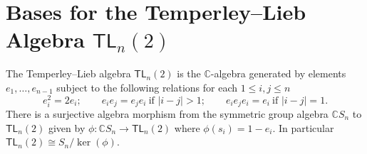 \documentclass[submission]{FPSAC2024}
\theoremstyle{definition}
\theoremstyle{remark}
\numberwithin{equation}{section}
\newcommand{\CC}{\mathbb{C}}
\newcommand{\TL}{\mathsf{TL}}
\begin{document}
%
%
%
%


\section{Bases for the Temperley--Lieb Algebra $\TL_{n}(2)$}
\label{sec:TLbasis}

The Temperley--Lieb algebra $\TL_{n}(2)$ is the $\CC$-algebra generated by elements $e_{1}, \ldots, e_{n-1}$ subject to the following relations for each $1 \le i, j \le n$
\[
e_{i}^{2} = 2 e_{i}; \qquad
e_{i}e_{j} = e_{j}e_{i}  \ \text{if $|i - j| > 1$}; \qquad
e_{i} e_{j} e_{i} = e_{i} \  \text{if $|i - j| = 1$}.
\]
There is a surjective algebra morphism from the symmetric group algebra $\CC S_{n}$ to $\TL_{n}(2)$ given by $\phi: \CC S_{n} \to \TL_{n}(2)$ where $\phi(s_{i})= 1 - e_{i}$.
In particular $\TL_{n}(2)\cong S_n\big/\!\ker(\phi)$.
\end{document}
